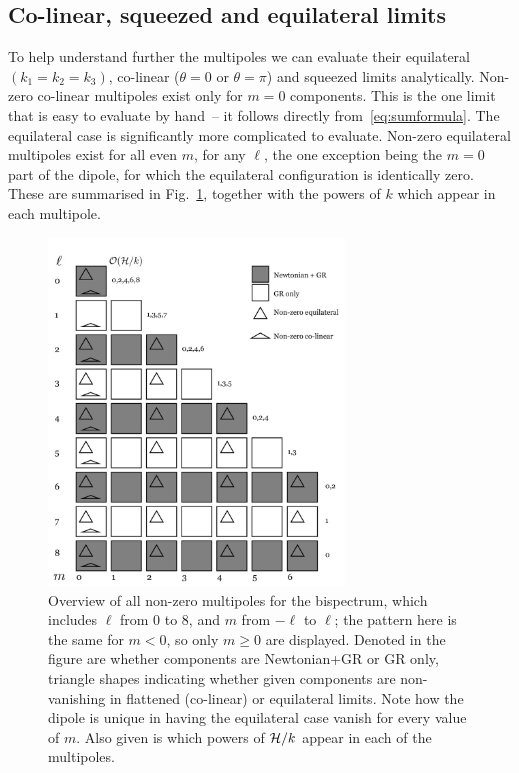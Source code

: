 \subsection{Co-linear, squeezed and equilateral limits}


To help understand further the multipoles we can evaluate their equilateral $(k_1=k_2=k_3)$, co-linear ($\theta=0$ or $\theta=\pi$) and squeezed limits analytically.  
Non-zero co-linear multipoles exist only for $m=0$ components. This is the one limit that is easy to evaluate by hand~-- it follows directly from~\eqref{eq:sumformula}. 
The equilateral case is significantly more complicated to evaluate.
Non-zero equilateral multipoles exist for all even $m$, for any $\ell$, the one exception being the $m=0$ part of the dipole, for which the equilateral configuration is identically zero. These are summarised in Fig.~\ref{fig:blm_overview}, together with the powers of $k$ which appear in each multipole.
\begin{figure}[ht]
\centering
\includegraphics[width=0.7\textwidth]{fig/overview.pdf}
\caption{Overview of all non-zero multipoles for the bispectrum, which includes $\ell$ from 0 to 8, and $m$ from $-\ell$ to $\ell$; the pattern here is the same for $m < 0$, so only $m \geq 0$ are displayed. Denoted in the figure are whether components are Newtonian+GR or GR only, triangle shapes indicating whether given components are non-vanishing in flattened (co-linear) or equilateral limits. Note how the dipole is unique in having the equilateral case vanish for every value of \(m\). Also given is which powers of $\mathcal{H}/k$ appear in each of the multipoles. \label{fig:blm_overview}}
\end{figure}

